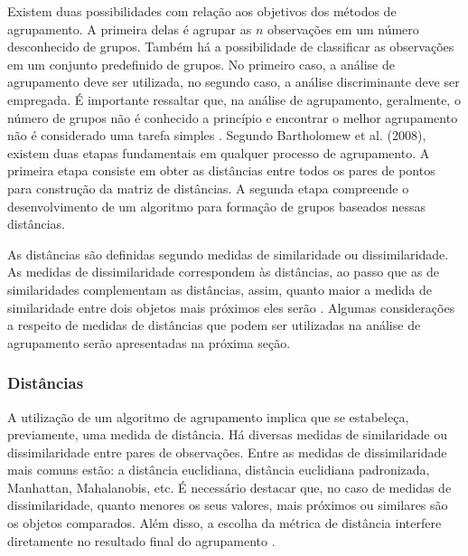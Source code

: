 \documentclass[
	12pt,				%
	openright,			%
	oneside,			%
	a4paper,			%
	chapter=TITLE,		%
	section=TITLE,		%
	english,			%
	french,				%
	spanish,			%
	brazil				%
	]{abntex2}
\begin{document}

Existem duas possibilidades com relação aos objetivos dos métodos de agrupamento. A primeira delas é  agrupar as $n$ observações em um número desconhecido de grupos. Também há a possibilidade de classificar as observações em um conjunto predefinido de grupos. No primeiro caso, a análise de agrupamento deve ser utilizada, no segundo caso, a análise discriminante deve ser empregada. É importante ressaltar que, na análise de agrupamento, geralmente, o número de grupos não é conhecido a princípio e encontrar o melhor agrupamento não é considerado uma tarefa simples \cite{ferreira11}. 
Segundo Bartholomew et al. (2008), existem duas etapas fundamentais em qualquer processo de agrupamento. A primeira etapa consiste em obter as distâncias entre todos os pares de pontos para construção da matriz de distâncias. A segunda etapa compreende o desenvolvimento de um algoritmo para formação de grupos baseados nessas distâncias. 

As distâncias são definidas segundo medidas de similaridade ou dissimilaridade. As medidas de dissimilaridade correspondem às distâncias, ao passo que as de similaridades complementam as distâncias, assim, quanto maior a medida de similaridade entre dois objetos mais próximos eles serão \cite{ferreira11}. Algumas considerações a respeito de medidas de distâncias que podem ser utilizadas na análise de agrupamento serão apresentadas na próxima seção.

\subsubsection{Distâncias} 

A utilização de um algoritmo de agrupamento implica que se estabeleça, previamente, uma medida de distância. Há diversas medidas de similaridade ou dissimilaridade entre pares de observações. Entre as medidas de dissimilaridade mais comuns estão: a distância euclidiana, distância euclidiana padronizada, Manhattan, Mahalanobis, etc. É necessário destacar que, no caso de medidas de dissimilaridade, quanto menores os seus valores, mais próximos ou similares são os objetos comparados. Além disso, a escolha da métrica de distância interfere diretamente no resultado final do agrupamento \cite{mingoti10, everitt11}.  
\end{document}
